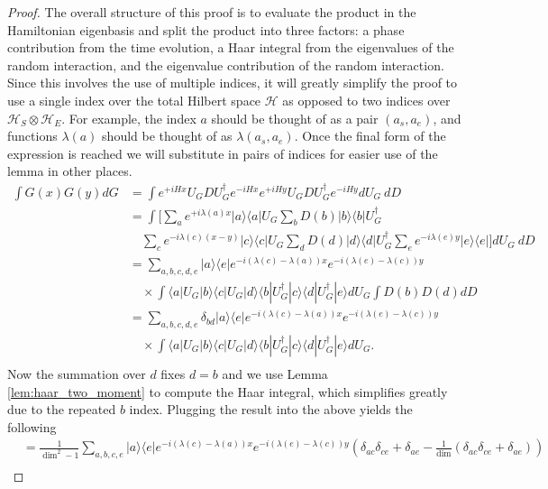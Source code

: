 \documentclass{article}
\newcommand{\ket}[1]{|#1\rangle}
\newcommand{\bra}[1]{\langle #1|}
\newcommand{\ketbra}[2]{| #1\rangle\! \langle #2|}
\newcommand{\parens}[1]{\left( #1 \right)}
\newcommand{\hilb}{\mathcal{H}}
\begin{document}
\begin{proof}
The overall structure of this proof is to evaluate the product in the Hamiltonian eigenbasis and split the product into three factors: a phase contribution from the time evolution, a Haar integral from the eigenvalues of the random interaction, and the eigenvalue contribution of the random interaction. Since this involves the use of multiple indices, it will greatly simplify the proof to use a single index over the total Hilbert space $\hilb$ as opposed to two indices over $\hilb_S \otimes \hilb_E$. For example, the index $a$ should be thought of as a pair $(a_s, a_e)$, and functions $\lambda(a)$ should be thought of as $\lambda(a_s, a_e)$. Once the final form of the expression is reached we will substitute in pairs of indices for easier use of the lemma in other places.
    \begin{align}
        \int G(x) G(y) dG &= \int e^{+i H x} U_G D U_G^\dagger e^{-i H x} e^{+i H y} U_G D U_G^\dagger e^{-i H y} dU_G ~dD \\
        &= \int \bigg[\sum_a e^{+i \lambda(a)x}\ketbra{a}{a}  U_G \sum_b D(b)\ketbra{b}{b} U_G^\dagger \nonumber \\
        &\quad \sum_c e^{-i \lambda(c) (x - y)} \ketbra{c}{c} U_G \sum_d D(d)\ketbra{d}{d} U_G^\dagger \sum_e e^{-i \lambda(e) y} \ketbra{e}{e} \bigg] dU_G ~dD\\
        &=\sum_{a,b,c,d,e} \ketbra{a}{e} e^{-i (\lambda(c) - \lambda(a))x} e^{-i (\lambda(e) - \lambda(c))y} \nonumber \\
        &\quad \times \int \bra{a} U_G \ket{b} \bra{c} U_G \ket{d} \bra{b} U_G^{\dagger} \ket{c} \bra{d} U_G^\dagger \ket{e} dU_G \int D(b) D(d) dD \\
        &=  \sum_{a, b, c, d, e} \delta_{bd} \ketbra{a}{e} e^{-i (\lambda(c) - \lambda(a))x} e^{-i (\lambda(e) - \lambda(c))y} \nonumber \\
        &\quad \times \int \bra{a} U_G \ket{b} \bra{c} U_G \ket{d} \bra{b} U_G^{\dagger} \ket{c} \bra{d} U_G^\dagger \ket{e} dU_G. \\
    \end{align}
    Now the summation over $d$ fixes $d=b$ and we use Lemma \ref{lem:haar_two_moment} to compute the Haar integral, which simplifies greatly due to the repeated $b$ index. Plugging the result into the above yields the following
    \begin{align}
        &= \frac{1}{\dim^2 - 1} \sum_{a, b, c, e} \ketbra{a}{e} e^{-i (\lambda(c) - \lambda(a))x} e^{-i (\lambda(e) - \lambda(c))y} \parens{\delta_{ac} \delta_{ce} + \delta_{ae} - \frac{1}{\dim} \parens{\delta_{ac} \delta_{ce} + \delta_{ae}}}  \\

\end{align}
\end{proof}
\end{document}
